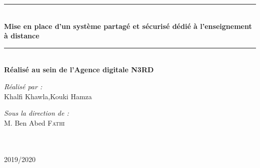 \begin{titlepage}
\begin{center}
\rule{\linewidth}{0.3mm} \\[0.4cm]
{ \huge \bfseries\color{blue!70!black} Mise en place d'un système partagé et sécurisé
	dédié à l’enseignement à distance \\[0.4cm] }
\rule{\linewidth}{0.3mm} \\[0.4cm]
{\large \bfseries Réalisé au sein de l'Agence digitale N3RD}\\[0.5cm]
 \noindent
\begin{minipage}{0.4\textwidth}
  \begin{flushleft} \large
    \emph{\color{orange!80!black}Réalisé par :}\\
    Khalfi Khawla,Kouki Hamza \\
  \end{flushleft}
\end{minipage}%
\begin{minipage}{0.5\textwidth}
  \begin{flushright} \large
    \emph{\color{orange!80!black}Sous la direction de :} \\
    M. Ben Abed \textsc{Fathi} \\
  \end{flushright}
\end{minipage}\\[4cm]





{\large \color{orange!80!black}{Année universitaire}\\ \color{blue!80!black}2019/2020}

\end{center}
\end{titlepage}

